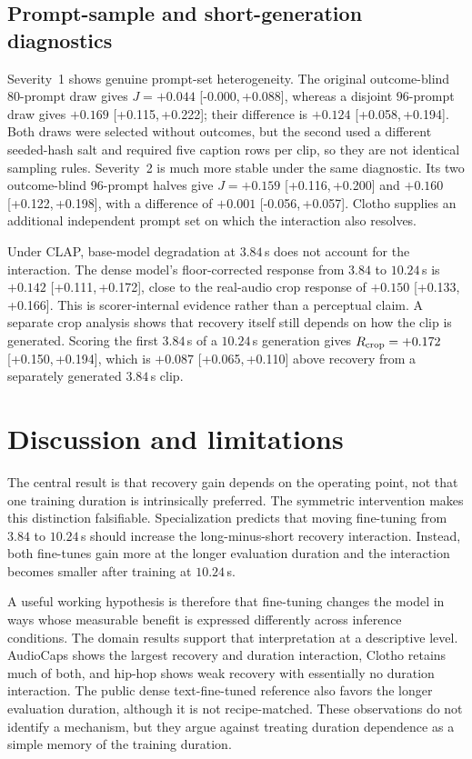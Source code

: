 \documentclass{article}
\newcommand{\ci}[2]{[{#1},\,{#2}]}
\begin{document}
\subsection{Prompt-sample and short-generation diagnostics}
Severity~1 shows genuine prompt-set heterogeneity. The original outcome-blind $80$-prompt draw gives $J=+0.044$ \ci{-0.000}{+0.088}, whereas a disjoint $96$-prompt draw gives $+0.169$ \ci{+0.115}{+0.222}; their difference is $+0.124$ \ci{+0.058}{+0.194}. Both draws were selected without outcomes, but the second used a different seeded-hash salt and required five caption rows per clip, so they are not identical sampling rules. Severity~2 is much more stable under the same diagnostic. Its two outcome-blind $96$-prompt halves give $J=+0.159$ \ci{+0.116}{+0.200} and $+0.160$ \ci{+0.122}{+0.198}, with a difference of $+0.001$ \ci{-0.056}{+0.057}. Clotho supplies an additional independent prompt set on which the interaction also resolves.

Under CLAP, base-model degradation at $3.84$\,s does not account for the interaction. The dense model's floor-corrected response from $3.84$ to $10.24$\,s is $+0.142$ \ci{+0.111}{+0.172}, close to the real-audio crop response of $+0.150$ \ci{+0.133}{+0.166}. This is scorer-internal evidence rather than a perceptual claim. A separate crop analysis shows that recovery itself still depends on how the clip is generated. Scoring the first $3.84$\,s of a $10.24$\,s generation gives $R_{\rm crop}=+0.172$ \ci{+0.150}{+0.194}, which is $+0.087$ \ci{+0.065}{+0.110} above recovery from a separately generated $3.84$\,s clip.
\section{Discussion and limitations}
The central result is that recovery gain depends on the operating point, not that one training duration is intrinsically preferred. The symmetric intervention makes this distinction falsifiable. Specialization predicts that moving fine-tuning from $3.84$ to $10.24$\,s should increase the long-minus-short recovery interaction. Instead, both fine-tunes gain more at the longer evaluation duration and the interaction becomes smaller after training at $10.24$\,s.

A useful working hypothesis is therefore that fine-tuning changes the model in ways whose measurable benefit is expressed differently across inference conditions. The domain results support that interpretation at a descriptive level. AudioCaps shows the largest recovery and duration interaction, Clotho retains much of both, and hip-hop shows weak recovery with essentially no duration interaction. The public dense text-fine-tuned reference also favors the longer evaluation duration, although it is not recipe-matched. These observations do not identify a mechanism, but they argue against treating duration dependence as a simple memory of the training duration.
\end{document}

